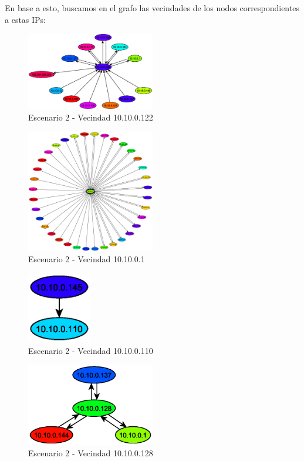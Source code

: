     En base a esto, buscamos en el grafo las vecindades de los nodos correspondientes a estas IPs:
    \begin{figure}[!ht]
		\centering
		\includegraphics[width=0.5\textwidth]{img/graph/escenario_2/vecindad122.eps}
		\caption{Escenario 2 - Vecindad 10.10.0.122}
		\label{fig:escenario2_vecindad122}
	\end{figure}
    \begin{figure}[!ht]
		\centering
		\includegraphics[width=0.5\textwidth]{img/graph/escenario_2/vecindad1.eps}
		\caption{Escenario 2 - Vecindad 10.10.0.1}
		\label{fig:escenario2_vecindad1}
	\end{figure}
    \begin{figure}[!ht]
		\centering
		\includegraphics[width=0.25\textwidth]{img/graph/escenario_2/vecindad110.eps}
		\caption{Escenario 2 - Vecindad 10.10.0.110}
		\label{fig:escenario2_vecindad110}
	\end{figure}
    \begin{figure}[!ht]
		\centering
		\includegraphics[width=0.5\textwidth]{img/graph/escenario_2/vecindad128.eps}
		\caption{Escenario 2 - Vecindad 10.10.0.128}
		\label{fig:escenario2_vecindad128}
	\end{figure}
